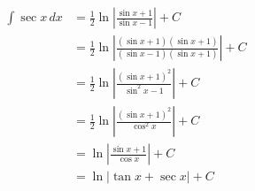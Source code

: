 \documentclass[12pt]{article}
\begin{document}
\begin{enumerate}
\begin{center}
\begin{align*}
\int \sec{x} \,dx &= \frac{1}{2}\ln{\left|\frac{\sin{x}+1}{\sin{x}-1}\right|}+C\\
&=\frac{1}{2}\ln{\left|\frac{(\sin{x}+1)(\sin{x}+1)}{(\sin{x}-1)(\sin{x}+1)}\right|}+C\\
&=\frac{1}{2}\ln{\left|\frac{(\sin{x}+1)^2}{\sin^2{x}-1}\right|}+C\\
&=\frac{1}{2}\ln{\left|\frac{(\sin{x}+1)^2}{\cos^2{x}}\right|}+C\\
&=\ln{\left|\frac{\sin{x}+1}{\cos{x}}\right|}+C\\
&=\ln{\left|\tan{x}+\sec{x}\right|}+C
\end{align*}
\end{center}

\end{enumerate}
\end{document}
